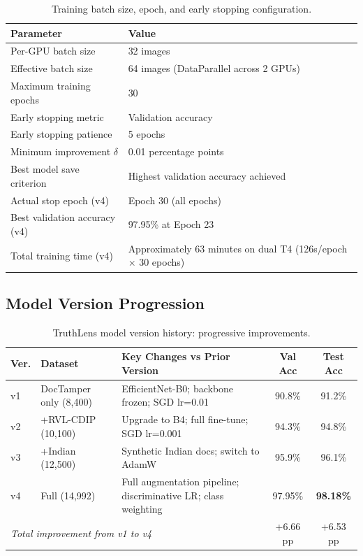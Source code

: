 \documentclass[12pt,a4paper,oneside]{report}
\begin{document}
\begin{table}[H]
\centering
\caption{Training batch size, epoch, and early stopping configuration.}
\label{tab:training_config}
\renewcommand{\arraystretch}{1.3}
\begin{tabular}{ll}
\toprule
\textbf{Parameter} & \textbf{Value} \\
\midrule
Per-GPU batch size       & 32 images \\
Effective batch size     & 64 images (DataParallel across 2 GPUs) \\
Maximum training epochs  & 30 \\
Early stopping metric    & Validation accuracy \\
Early stopping patience  & 5 epochs \\
Minimum improvement $\delta$ & 0.01 percentage points \\
Best model save criterion & Highest validation accuracy achieved \\
Actual stop epoch (v4)   & Epoch 30 (all epochs) \\
Best validation accuracy (v4) & 97.95\% at Epoch 23 \\
Total training time (v4) & Approximately 63 minutes on dual T4 (126s/epoch $\times$ 30 epochs) \\
\bottomrule
\end{tabular}
\end{table}

\subsection{Model Version Progression}

\begin{table}[H]
\centering
\caption{TruthLens model version history: progressive improvements.}
\label{tab:version_full}
\renewcommand{\arraystretch}{1.3}
\begin{tabular}{p{1.2cm}p{3cm}p{4.5cm}cc}
\toprule
\textbf{Ver.} & \textbf{Dataset} & \textbf{Key Changes vs Prior Version} & \textbf{Val Acc} & \textbf{Test Acc} \\
\midrule
v1 & DocTamper only (8,400) & EfficientNet-B0; backbone frozen; SGD lr=0.01 & 90.8\% & 91.2\% \\
v2 & +RVL-CDIP (10,100)     & Upgrade to B4; full fine-tune; SGD lr=0.001  & 94.3\% & 94.8\% \\
v3 & +Indian (12,500)       & Synthetic Indian docs; switch to AdamW        & 95.9\% & 96.1\% \\
v4 & Full (14,992)          & Full augmentation pipeline; discriminative LR; class weighting & 97.95\% & \textbf{98.18\%} \\
\midrule
\multicolumn{3}{l}{\textit{Total improvement from v1 to v4}} & +6.66 pp & +6.53 pp \\
\bottomrule
\end{tabular}
\end{table}
\end{document}
